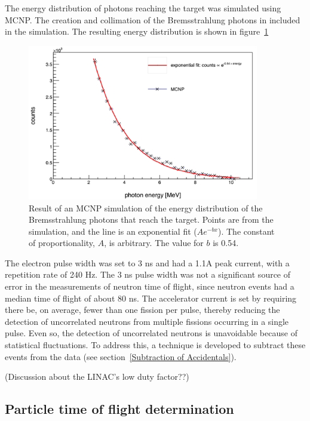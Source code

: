 The energy distribution of photons reaching the target was simulated using MCNP. The creation and collimation of the Bremsstrahlung photons in included in the simulation. The resulting energy distribution is shown in figure~\ref{fig:BremDist}

\begin{figure}[h]
\includegraphics[width=0.9\textwidth]{Content/Methods/MCNPBremDistribution.png}
\caption{Result of an MCNP simulation of the energy distribution of the Bremsstrahlung photons that reach the target. Points are from the simulation, and the line is an exponential fit ($Ae^{-bx}$). The constant of proportionality, $A$, is arbitrary. The value for $b$ is 0.54.}
\label{fig:BremDist}
\end{figure}

The electron pulse width was set to 3 ns and had a 1.1A peak current, with a repetition rate of 240 Hz. The 3 ns pulse width was not a significant source of error in the measurements of neutron time of flight, since neutron events had a median time of flight of about 80 ns. 
The accelerator current is set by requiring there be, on average, fewer than one fission per pulse, thereby reducing the detection of uncorrelated neutrons from multiple fissions occurring in a single pulse. Even so, the detection of uncorrelated neutrons is unavoidable because of statistical fluctuations. To address this, a technique is developed to subtract these events from the data (see section~\ref{Subtraction of Accidentals}).

(Discussion about the LINAC's low duty factor??)

\subsection{Particle time of flight determination}
\label{reconstruction}

